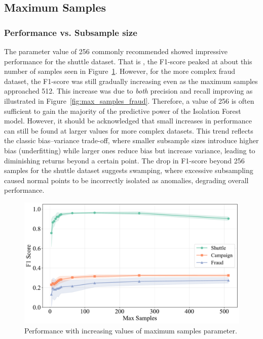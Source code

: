 \documentclass[10pt, conference]{IEEEtran}
\begin{document}

\subsection{Maximum Samples}
\subsubsection{Performance vs. Subsample size}
The parameter value of 256 commonly recommended \cite{iforest2} showed impressive performance for the shuttle dataset. That is , the F1-score peaked at about this number of samples seen in Figure~\ref{fig:max_samples_all}. However, for the more complex fraud dataset, the F1-score was still gradually increasing even as the maximum samples approached 512. This increase was due to \textit{both} precision and recall improving as illustrated in Figure~\ref{fig:max_samples_fraud}. Therefore, a value of 256 is often sufficient to gain the majority of the predictive power of the Isolation Forest model. However, it should be acknowledged that small increases in performance can still be found at larger values for more complex datasets. This trend reflects the classic bias–variance trade-off, where smaller subsample sizes introduce higher bias (underfitting) while larger ones reduce bias but increase variance, leading to diminishing returns beyond a certain point. The drop in F1-score beyond 256 samples for the shuttle dataset suggests swamping, where excessive subsampling caused normal points to be incorrectly isolated as anomalies, degrading overall performance.
\begin{figure}[H]
	\centering
	\includegraphics[width=0.95\linewidth]{../results/multi_dataset/max_samples_f1.pdf}
	\caption{Performance with increasing values of maximum samples parameter.}
	\label{fig:max_samples_all}
\end{figure}
\end{document}
